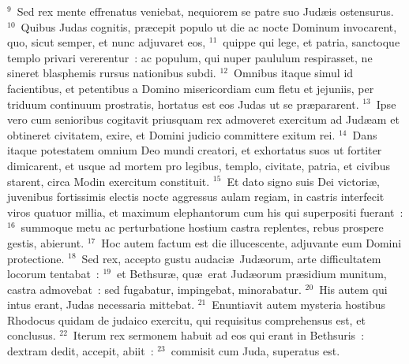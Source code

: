 ${}^{9}$~Sed rex mente effrenatus veniebat, nequiorem se patre suo Jud\ae is ostensurus.
${}^{10}$~Quibus Judas cognitis, pr\ae cepit populo ut die ac nocte Dominum invocarent, quo, sicut semper, et nunc adjuvaret eos,
${}^{11}$~quippe qui lege, et patria, sanctoque templo privari vererentur~: ac populum, qui nuper paululum respirasset, ne sineret blasphemis rursus nationibus subdi.
${}^{12}$~Omnibus itaque simul id facientibus, et petentibus a Domino misericordiam cum fletu et jejuniis, per triduum continuum prostratis, hortatus est eos Judas ut se pr\ae pararent.
${}^{13}$~Ipse vero cum senioribus cogitavit priusquam rex admoveret exercitum ad Jud\ae am et obtineret civitatem, exire, et Domini judicio committere exitum rei.
${}^{14}$~Dans itaque potestatem omnium Deo mundi creatori, et exhortatus suos ut fortiter dimicarent, et usque ad mortem pro legibus, templo, civitate, patria, et civibus starent, circa Modin exercitum constituit.
${}^{15}$~Et dato signo suis Dei victori\ae , juvenibus fortissimis electis nocte aggressus aulam regiam, in castris interfecit viros quatuor millia, et maximum elephantorum cum his qui superpositi fuerant~:
${}^{16}$~summoque metu ac perturbatione hostium castra replentes, rebus prospere gestis, abierunt.
${}^{17}$~Hoc autem factum est die illucescente, adjuvante eum Domini protectione.
${}^{18}$~Sed rex, accepto gustu audaci\ae\ Jud\ae orum, arte difficultatem locorum tentabat~:
${}^{19}$~et Bethsur\ae , qu\ae\ erat Jud\ae orum pr\ae sidium munitum, castra admovebat~: sed fugabatur, impingebat, minorabatur.
${}^{20}$~His autem qui intus erant, Judas necessaria mittebat.
${}^{21}$~Enuntiavit autem mysteria hostibus Rhodocus quidam de judaico exercitu, qui requisitus comprehensus est, et conclusus.
${}^{22}$~Iterum rex sermonem habuit ad eos qui erant in Bethsuris~: dextram dedit, accepit, abiit~:
${}^{23}$~commisit cum Juda, superatus est.

